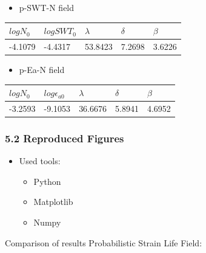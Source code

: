 \documentclass[11pt]{article}
\providecommand{\tightlist}{%
      \setlength{\itemsep}{0pt}\setlength{\parskip}{0pt}}
\begin{document}
\begin{itemize}
\tightlist
\item
  p-SWT-N field
\end{itemize}

\begin{longtable}[]{@{}lllll@{}}
\toprule
\(logN_0\) & \(logSWT_0\) & \(\lambda\) & \(\delta\) &
\(\beta\)\tabularnewline
\midrule
\endhead
-4.1079 & -4.4317 & 53.8423 & 7.2698 & 3.6226\tabularnewline
\bottomrule
\end{longtable}

\begin{itemize}
\tightlist
\item
  p-Ea-N field
\end{itemize}

\begin{longtable}[]{@{}lllll@{}}
\toprule
\(logN_0\) & \(log\epsilon_{a0}\) & \(\lambda\) & \(\delta\) &
\(\beta\)\tabularnewline
\midrule
\endhead
-3.2593 & -9.1053 & 36.6676 & 5.8941 & 4.6952\tabularnewline
\bottomrule
\end{longtable}

\hypertarget{reproduced-figures}{%
\subsubsection{5.2 Reproduced Figures}\label{reproduced-figures}}

\begin{itemize}
\tightlist
\item
  Used tools:

  \begin{itemize}
  \tightlist
  \item
    Python
  \item
    Matplotlib
  \item
    Numpy
  \end{itemize}
\end{itemize}

Comparison of results Probabilistic Strain Life Field:
\end{document}

